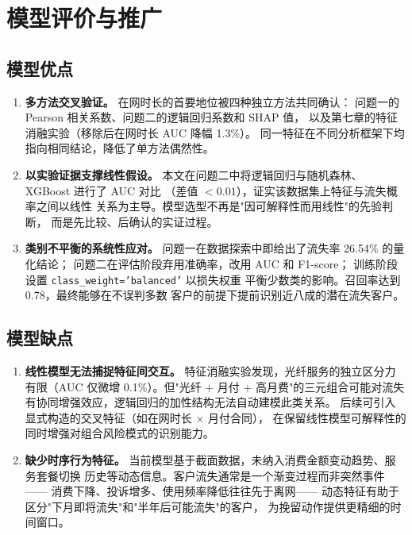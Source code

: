 \section{模型评价与推广}

\subsection{模型优点}

\begin{enumerate}
    \item \textbf{多方法交叉验证。}
    在网时长的首要地位被四种独立方法共同确认：
    问题一的 Pearson 相关系数、问题二的逻辑回归系数和 SHAP 值，
    以及第七章的特征消融实验（移除后在网时长 AUC 降幅 1.3\%）。
    同一特征在不同分析框架下均指向相同结论，降低了单方法偶然性。

    \item \textbf{以实验证据支撑线性假设。}
    本文在问题二中将逻辑回归与随机森林、XGBoost 进行了 AUC 对比
    （差值 $< 0.01$），证实该数据集上特征与流失概率之间以线性
    关系为主导。模型选型不再是"因可解释性而用线性"的先验判断，
    而是先比较、后确认的实证过程。

    \item \textbf{类别不平衡的系统性应对。}
    问题一在数据探索中即给出了流失率 26.54\% 的量化结论；
    问题二在评估阶段弃用准确率，改用 AUC 和 F1-score；
    训练阶段设置 \texttt{class\_weight='balanced'} 以损失权重
    平衡少数类的影响。召回率达到 0.78，最终能够在不误判多数
    客户的前提下提前识别近八成的潜在流失客户。
\end{enumerate}

\subsection{模型缺点}

\begin{enumerate}
    \item \textbf{线性模型无法捕捉特征间交互。}
特征消融实验发现，光纤服务的独立区分力有限（AUC 仅微增
0.1\%）。但"光纤 + 月付 + 高月费"的三元组合可能对流失
    有协同增强效应，逻辑回归的加性结构无法自动建模此类关系。
    后续可引入显式构造的交叉特征（如在网时长 $\times$ 月付合同），
    在保留线性模型可解释性的同时增强对组合风险模式的识别能力。

    \item \textbf{缺少时序行为特征。}
    当前模型基于截面数据，未纳入消费金额变动趋势、服务套餐切换
    历史等动态信息。客户流失通常是一个渐变过程而非突然事件——
    消费下降、投诉增多、使用频率降低往往先于离网——
    动态特征有助于区分"下月即将流失"和"半年后可能流失"的客户，
    为挽留动作提供更精细的时间窗口。
\end{enumerate}

